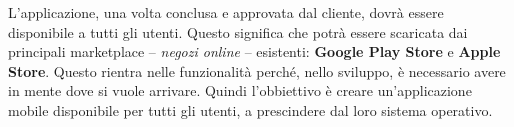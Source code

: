\documentclass[./main.tex]{subfiles}
\begin{document}
L'applicazione, una volta conclusa e approvata dal cliente, dovrà essere disponibile a tutti gli utenti. Questo significa che potrà essere scaricata dai principali marketplace -- \textit{negozi online} -- esistenti: \textbf{Google Play Store} e \textbf{Apple Store}. Questo rientra nelle funzionalità perché, nello sviluppo, è necessario avere in mente dove si vuole arrivare. Quindi l'obbiettivo è creare un'applicazione mobile disponibile per tutti gli utenti, a prescindere dal loro sistema operativo.\par
\end{document}

